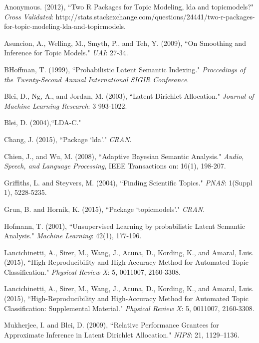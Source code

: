 \documentclass[12pt]{article}
\begin{document}
\newpage
\begin{thebibliography}{4}
		
	Anonymous. (2012),
	``Two R Packages for Topic Modeling, lda and topicmodels?" \textit{Cross Validated}: http://stats.stackexchange.com/questions/24441/two-r-packages-for-topic-modeling-lda-and-topicmodels.
	
	Asuncion, A., Welling, M., Smyth, P., and Teh, Y.  (2009),
	``On Smoothing and Inference for Topic Models." 
	\textit{UAI}: 27-34.
	
	BHoffman, T.  (1999),
	``Probabilistic Latent Semantic Indexing."
	\textit{Proccedings of the Twenty-Second Annual International SIGIR Conferance}.
		
	Blei, D., Ng, A., and Jordan, M.  (2003),
	``Latent Dirichlet Allocation."
	\textit{Journal of Machine Learning Research}: 3 993-1022.
	
	Blei, D. (2004),``LDA-C."
		
	Chang, J.  (2015),
	``Package `lda'."
	\textit{CRAN}.

	Chien, J., and Wu, M.  (2008),
	``Adaptive Bayesian Semantic Analysis."
	\textit{Audio, Speech, and Language Processing}, IEEE Transactions on: 16(1), 198-207.

	Griffiths, L. and Steyvers, M.  (2004),
	``Finding Scientific Topics."
	\textit{PNAS}: 1(Suppl 1), 5228-5235.

	Grun, B. and Hornik, K.  (2015),
	``Package `topicmodels'."
	\textit{CRAN}.
	
	Hofmann, T.  (2001),
	``Unsupervised Learning by probabilistic Latent Semantic Analysis."
	\textit{Machine Learning}: 42(1), 177-196.
	
	Lancichinetti, A., Sirer, M., Wang, J., Acuna, D., Kording, K., and Amaral, Luis. (2015),
	``High-Reproducibility and High-Accuracy Method for Automated Topic Classification."
	\textit{Physical Review X}: 5, 0011007, 2160-3308.
	
	Lancichinetti, A., Sirer, M., Wang, J., Acuna, D., Kording, K., and Amaral, Luis. (2015),
	``High-Reproducibility and High-Accuracy Method for Automated Topic Classification: Supplemental Material."
	\textit{Physical Review X}: 5, 0011007, 2160-3308.
	
	Mukherjee, I. and Blei, D.  (2009),
	``Relative Performance Grantees for Approximate Inference in Latent Dirichlet Allocation." 
	\textit{NIPS}: 21, 1129–1136.
	

\end{thebibliography}
\end{document}
